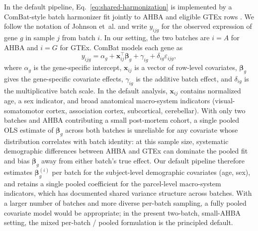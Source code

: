 \documentclass[11pt]{article}
\numberwithin{equation}{section}
\begin{document}
In the default pipeline, Eq.~\eqref{eq:shared-harmonization} is implemented by a
ComBat-style batch harmonizer fit jointly to AHBA and eligible GTEx rows
\cite{johnson2007combat}.  We follow the notation of Johnson et~al. and write
$y_{ijg}$ for the observed expression of gene $g$ in sample $j$ from batch $i$.
In our setting, the two batches are $i=A$ for AHBA and $i=G$ for GTEx.  ComBat
models each gene as
\begin{equation}
  \label{eq:combat-model}
  y_{ijg}
  =
  \alpha_g
  +
  \mathbf{x}_{ij}^{\top}\boldsymbol{\beta}_g
  +
  \gamma_{ig}
  +
  \delta_{ig}\varepsilon_{ijg},
\end{equation}
where $\alpha_g$ is the gene-specific intercept, $\mathbf{x}_{ij}$ is a vector of
row-level covariates, $\boldsymbol{\beta}_g$ gives the gene-specific covariate
effects, $\gamma_{ig}$ is the additive batch effect, and $\delta_{ig}$ is the
multiplicative batch scale.  In the default analysis, $\mathbf{x}_{ij}$ contains
normalized age, a sex indicator, and broad anatomical macro-system indicators (visual-somatomotor cortex, association cortex, subcortical, cerebellar).  With only two
batches and AHBA contributing a small post-mortem cohort, a single pooled OLS
estimate of $\boldsymbol{\beta}_g$ across both batches is unreliable for any
covariate whose distribution correlates with batch identity: at this sample size,
systematic demographic differences between AHBA and GTEx can dominate the pooled
fit and bias $\boldsymbol{\beta}_g$ away from either batch's true effect.  Our
default pipeline therefore estimates $\boldsymbol{\beta}_g^{(i)}$ per batch for the
subject-level demographic covariates (age, sex), and retains a single pooled
coefficient for the parcel-level macro-system indicators, which has documented shared variance structure across batches.  With a larger number of batches and more diverse per-batch sampling, a
fully pooled covariate model would be appropriate; in the present two-batch,
small-AHBA setting, the mixed per-batch / pooled formulation is the principled
default.
\end{document}

